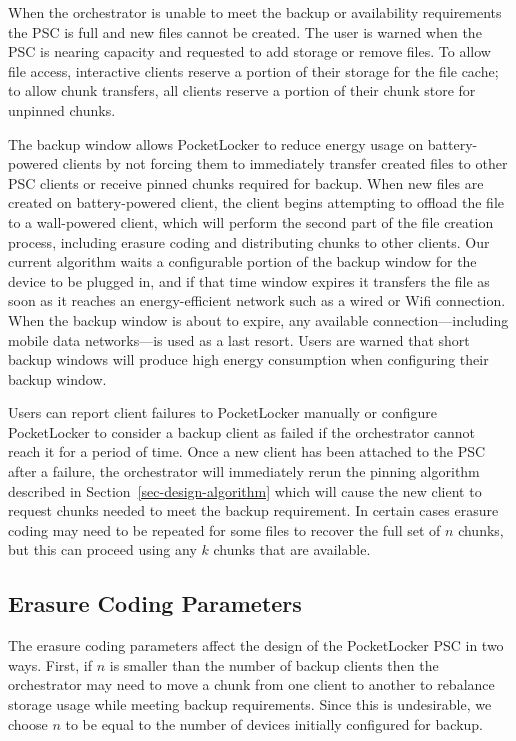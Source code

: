 When the orchestrator is unable to meet the backup or availability
requirements the PSC is full and new files cannot be created. The user is
warned when the PSC is nearing capacity and requested to add storage or
remove files. To allow file access, interactive clients reserve a portion of
their storage for the file cache; to allow chunk transfers, all clients
reserve a portion of their chunk store for unpinned chunks.

The backup window allows PocketLocker to reduce energy usage on
battery-powered clients by not forcing them to immediately transfer created
files to other PSC clients or receive pinned chunks required for backup. When
new files are created on battery-powered client, the client begins attempting
to offload the file to a wall-powered client, which will perform the second
part of the file creation process, including erasure coding and distributing
chunks to other clients. Our current algorithm waits a configurable portion
of the backup window for the device to be plugged in, and if that time window
expires it transfers the file as soon as it reaches an energy-efficient
network such as a wired or Wifi connection. When the backup window is about
to expire, any available connection---including mobile data networks---is used
as a last resort. Users are warned that short backup windows will produce
high energy consumption when configuring their backup window.

Users can report client failures to PocketLocker manually or configure
PocketLocker to consider a backup client as failed if the orchestrator cannot
reach it for a period of time. Once a new client has been attached to the PSC
after a failure, the orchestrator will immediately rerun the pinning
algorithm described in Section~\ref{sec-design-algorithm} which will cause
the new client to request chunks needed to meet the backup requirement. In
certain cases erasure coding may need to be repeated for some files to
recover the full set of $n$ chunks, but this can proceed using any $k$ chunks
that are available.

\subsection{Erasure Coding Parameters}

The erasure coding parameters affect the design of the PocketLocker PSC in
two ways. First, if $n$ is smaller than the number of backup clients then the
orchestrator may need to move a chunk from one client to another to rebalance
storage usage while meeting backup requirements. Since this is undesirable,
we choose $n$ to be equal to the number of devices initially configured for
backup.

